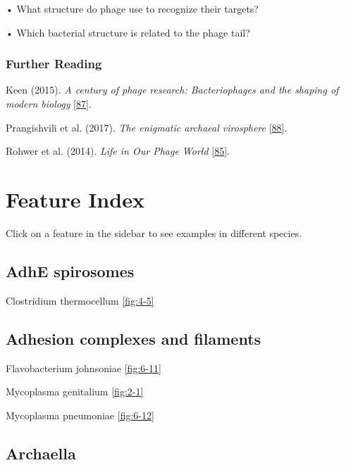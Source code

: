 \documentclass[]{tufte-book}
\begin{document}
• What structure do phage use to recognize their targets?

• Which bacterial structure is related to the phage tail?

\hypertarget{further-reading-9}{%
\subsection*{Further Reading}\label{further-reading-9}}

Keen (2015). \emph{A century of phage research: Bacteriophages and the shaping of modern biology} {[}\protect\hyperlink{ref-keen2015}{87}{]}.

Prangishvili et al. (2017). \emph{The enigmatic archaeal virosphere} {[}\protect\hyperlink{ref-prangishvili2017}{88}{]}.

Rohwer et al. (2014). \emph{Life in Our Phage World} {[}\protect\hyperlink{ref-rohwer2014}{85}{]}.

\hypertarget{appendix-appendix}{%
\appendix}


\hypertarget{feature-index}{%
\chapter{Feature Index}\label{feature-index}}

Click on a feature in the sidebar to see examples in different species.

\hypertarget{adhe-spirosomes}{%
\section*{AdhE spirosomes}\label{adhe-spirosomes}}

Clostridium thermocellum \ref{fig:4-5}

\hypertarget{adhesion-complexes-and-filaments}{%
\section*{Adhesion complexes and filaments}\label{adhesion-complexes-and-filaments}}

Flavobacterium johnsoniae \ref{fig:6-11}

Mycoplasma genitalium \ref{fig:2-1}

Mycoplasma pneumoniae \ref{fig:6-12}

\hypertarget{archaella}{%
\section*{Archaella}\label{archaella}}
\end{document}
